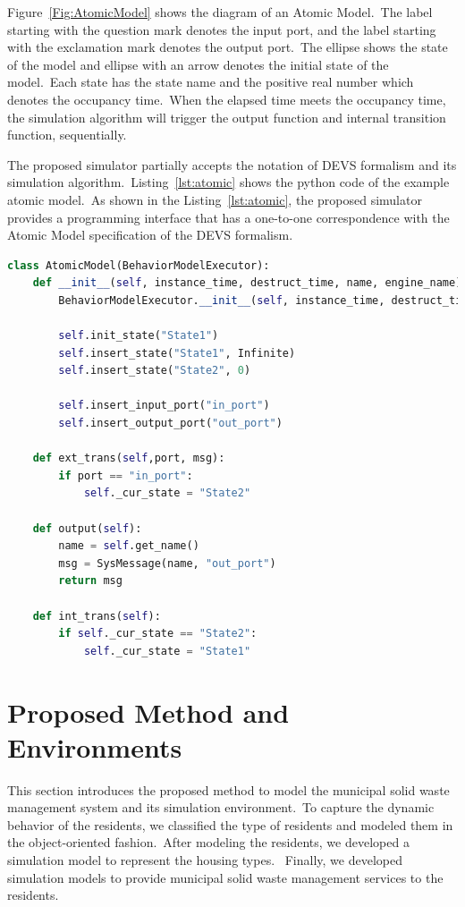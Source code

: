 \documentclass{scsSimAUDPaperFormat}
\begin{document}
Figure~\ref{Fig:AtomicModel} shows the diagram of an Atomic Model.~The label starting with the question mark denotes the input port, and the label starting with the exclamation mark denotes the output port.~The ellipse shows the state of the model and ellipse with an arrow denotes the initial state of the model.~Each state has the state name and the positive real number which denotes the occupancy time.~When the elapsed time meets the occupancy time, the simulation algorithm will trigger the output function and internal transition function, sequentially. 

The proposed simulator partially accepts the notation of DEVS formalism and its simulation algorithm.~Listing~\ref{lst:atomic} shows the python code of the example atomic model.~As shown in the Listing~\ref{lst:atomic}, the proposed simulator provides a programming interface that has a one-to-one correspondence with the Atomic Model specification of the DEVS formalism.


\begin{lstlisting}[language=Python, caption=Example Code of Atomic Model, label={lst:atomic}]
class AtomicModel(BehaviorModelExecutor):
    def __init__(self, instance_time, destruct_time, name, engine_name):
        BehaviorModelExecutor.__init__(self, instance_time, destruct_time, name, engine_name)

        self.init_state("State1")
        self.insert_state("State1", Infinite)
        self.insert_state("State2", 0)

        self.insert_input_port("in_port")
        self.insert_output_port("out_port")

    def ext_trans(self,port, msg):
        if port == "in_port":
            self._cur_state = "State2"

    def output(self):
        name = self.get_name()
        msg = SysMessage(name, "out_port")
        return msg
        
    def int_trans(self):
        if self._cur_state == "State2":
            self._cur_state = "State1"
\end{lstlisting}

\section{Proposed Method and Environments}

This section introduces the proposed method to model the municipal solid waste management system and its simulation environment.~To capture the dynamic behavior of the residents, we classified the type of residents and modeled them in the object-oriented fashion.~After modeling the residents, we developed a simulation model to represent the housing types. ~Finally, we developed simulation models to provide municipal solid waste management services to the residents. 
\end{document}
